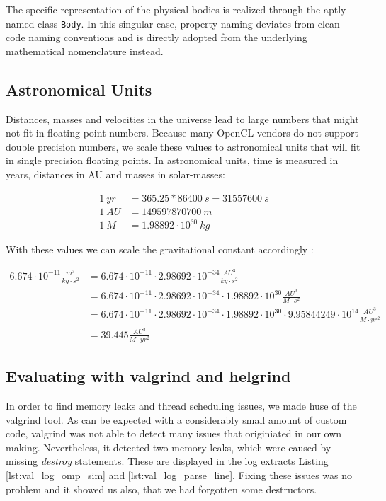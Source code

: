 \documentclass[a4paper,11pt]{scrartcl} %
\begin{document}
The specific representation of the physical bodies is realized through the aptly named class \texttt{Body}. In this singular case, property naming deviates from clean code naming conventions and is directly adopted from the underlying mathematical nomenclature instead.

\subsection{Astronomical Units}
Distances, masses and velocities in the universe lead to large numbers that might not fit in floating
point numbers. Because many OpenCL vendors do not support double precision numbers, we scale these values to astronomical units that will fit in single precision floating points. In astronomical units, time is
measured in years, distances in AU and masses in solar-masses:

\begin{align*}
	1~yr &= 365.25 * 86400~s = 31557600~s \\
	1~AU &= 149597870700~m \\
	1~M &=  1.98892 \cdot 10^{30}~kg
\end{align*}

With these values we can scale the gravitational constant accordingly \cite{astrounits}:

\begin{align*}
	6.674 \cdot 10^{-11} \frac{m^3}{kg \cdot s^2}
	& =  6.674 \cdot 10^{-11} \cdot 2.98692\cdot 10^{-34} \frac{AU^3}{kg \cdot s^2}\\
	& = 6.674 \cdot 10^{-11} \cdot 2.98692\cdot 10^{-34} \cdot 1.98892 \cdot 10^{30} \frac{AU^3}{M \cdot s^2} \\
	& = 6.674 \cdot 10^{-11} \cdot 2.98692\cdot 10^{-34} \cdot 1.98892 \cdot 10^{30} \cdot 9.95844249\cdot 10^{14} \frac{AU^3}{M \cdot yr^2}\\
	& = 39.445 \frac{AU^3}{M \cdot yr^2}
\end{align*}

\subsection{Evaluating with valgrind and helgrind}

In order to find memory leaks and thread scheduling issues, we made huse of the valgrind tool. As can be expected with a considerably small amount of custom code, valgrind was not able to detect many issues that originiated in our own making.
Nevertheless, it detected two memory leaks, which were caused by missing \emph{destroy} statements. These are displayed in the log extracts Listing \ref{lst:val_log_omp_sim} and \ref{lst:val_log_parse_line}.
Fixing these issues was no problem and it showed us also, that we had forgotten some destructors.
\end{document}
